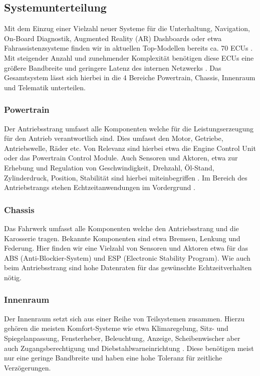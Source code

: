     \subsection{Systemunterteilung}
    Mit dem Einzug einer Vielzahl neuer Systeme für die Unterhaltung, Navigation, On-Board Diagnostik,
    Augmented Reality (AR) Dashboards oder etwa Fahrassistenzsysteme finden wir in aktuellen Top-Modellen bereits 
    ca. 70 ECUs \cite{ivn quellen}. Mit steigender Anzahl und zunehmender Komplexität 
    benötigen diese ECUs eine größere Bandbreite und geringere Latenz des internen Netzwerks \cite{TW_huang2018vehicle}.
    Das Gesamtsystem lässt sich hierbei in die 4 Bereiche Powertrain, Chassis, Innenraum und Telematik unterteilen.
        \subsubsection{Powertrain}
        Der Antriebsstrang umfasst alle Komponenten welche für die Leistungserzeugung für den Antrieb verantwortlich sind. Dies umfasst 
        den Motor, Getriebe, Antriebswelle, Räder etc. Von Relevanz sind hierbei etwa die Engine Control Unit oder das Powertrain Control Module.
        Auch Sensoren und Aktoren, etwa zur Erhebung und Regulation von Geschwindigkeit, Drehzahl, Öl-Stand, Zylinderdruck, Position, Stabilität sind hierbei miteinbegriffen \cite{IVN}.
        Im Bereich des Antriebstrangs stehen Echtzeitanwendungen im Vordergrund \cite{reif2011bosch}.
        \subsubsection{Chassis}
        Das Fahrwerk umfasst alle Komponenten welche den Antriebsstrang und die Karosserie tragen. Bekannte Komponenten sind etwa
        Bremsen, Lenkung und Federung. Hier finden wir eine Vielzahl von Sensoren und Aktoren etwa für das ABS (Anti-Blockier-System) und ESP (Electronic Stability Program).
        Wie auch beim Antriebsstrang sind hohe Datenraten für das gewünschte Echtzeitverhalten nötig.
        \subsubsection{Innenraum}
        Der Innenraum setzt sich aus einer Reihe von Teilsystemen zusammen. Hierzu gehören die meisten Komfort-Systeme wie etwa Klimaregelung, Sitz- und Spiegelanpassung, Fensterheber, Beleuchtung,
        Anzeige, Scheibenwischer aber auch Zugangsberechtigung und Diebstahlwarneinrichtung \cite{reif2011bosch}. 
        Diese benötigen meist nur eine geringe Bandbreite und haben eine hohe Toleranz für zeitliche Verzögerungen.
